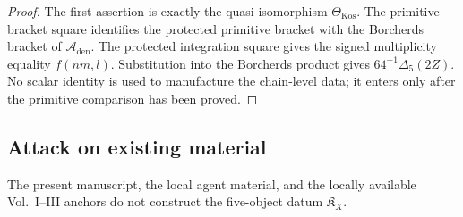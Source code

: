 \begin{proof}
The first assertion is exactly the quasi-isomorphism
\(\Theta_{\mathrm{Kos}}\).  The primitive bracket square identifies the
protected primitive bracket with the Borcherds bracket of
\(\mathcal A_{\mathrm{den}}\).  The protected integration square gives
the signed multiplicity equality \(f(nm,l)\).  Substitution into the
Borcherds product gives \(64^{-1}\Delta_5(2Z)\).  No scalar identity is
used to manufacture the chain-level data; it enters only after the
primitive comparison has been proved.
\end{proof}

\subsection{Attack on existing material}
\label{subsec:cell-eleven-attack-status}

\begin{theorem}
\label{thm:cell-eleven-none-built}
The present manuscript, the local agent material, and the locally
available Vol.~I--III anchors do not construct the five-object datum
\(\mathfrak K_X\).
\end{theorem}


